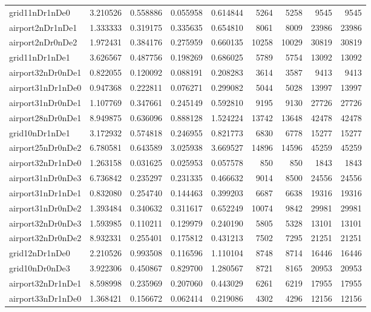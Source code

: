 \begin{longtable}{|l|r|r|r|r|r|r|r|r|}
grid11nDr1nDe0 & 3.210526 & 0.558886 & 0.055958 & 0.614844 & 5264 & 5258 & 9545 & 9545 \\
airport2nDr1nDe1 & 1.333333 & 0.319175 & 0.335635 & 0.654810 & 8061 & 8009 & 23986 & 23986 \\
airport2nDr0nDe2 & 1.972431 & 0.384176 & 0.275959 & 0.660135 & 10258 & 10029 & 30819 & 30819 \\
grid11nDr1nDe1 & 3.626567 & 0.487756 & 0.198269 & 0.686025 & 5789 & 5754 & 13092 & 13092 \\
airport32nDr0nDe1 & 0.822055 & 0.120092 & 0.088191 & 0.208283 & 3614 & 3587 & 9413 & 9413 \\
airport31nDr1nDe0 & 0.947368 & 0.222811 & 0.076271 & 0.299082 & 5044 & 5028 & 13997 & 13997 \\
airport31nDr0nDe1 & 1.107769 & 0.347661 & 0.245149 & 0.592810 & 9195 & 9130 & 27726 & 27726 \\
airport28nDr0nDe1 & 8.949875 & 0.636096 & 0.888128 & 1.524224 & 13742 & 13648 & 42478 & 42478 \\
grid10nDr1nDe1 & 3.172932 & 0.574818 & 0.246955 & 0.821773 & 6830 & 6778 & 15277 & 15277 \\
airport25nDr0nDe2 & 6.780581 & 0.643589 & 3.025938 & 3.669527 & 14896 & 14596 & 45259 & 45259 \\
airport32nDr1nDe0 & 1.263158 & 0.031625 & 0.025953 & 0.057578 & 850 & 850 & 1843 & 1843 \\
airport31nDr0nDe3 & 6.736842 & 0.235297 & 0.231335 & 0.466632 & 9014 & 8500 & 24556 & 24556 \\
airport31nDr1nDe1 & 0.832080 & 0.254740 & 0.144463 & 0.399203 & 6687 & 6638 & 19316 & 19316 \\
airport31nDr0nDe2 & 1.393484 & 0.340632 & 0.311617 & 0.652249 & 10074 & 9842 & 29981 & 29981 \\
airport32nDr0nDe3 & 1.593985 & 0.110211 & 0.129979 & 0.240190 & 5805 & 5328 & 13101 & 13101 \\
airport32nDr0nDe2 & 8.932331 & 0.255401 & 0.175812 & 0.431213 & 7502 & 7295 & 21251 & 21251 \\
grid12nDr1nDe0 & 2.210526 & 0.993508 & 0.116596 & 1.110104 & 8748 & 8714 & 16446 & 16446 \\
grid10nDr0nDe3 & 3.922306 & 0.450867 & 0.829700 & 1.280567 & 8721 & 8165 & 20953 & 20953 \\
airport32nDr1nDe1 & 8.598998 & 0.235969 & 0.207060 & 0.443029 & 6261 & 6219 & 17955 & 17955 \\
airport33nDr1nDe0 & 1.368421 & 0.156672 & 0.062414 & 0.219086 & 4302 & 4296 & 12156 & 12156 \\

\end{longtable}
